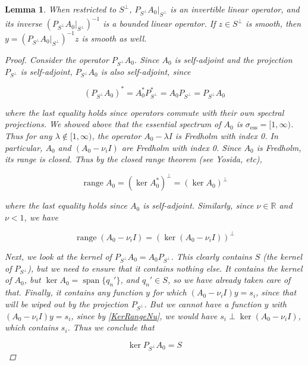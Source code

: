 \documentclass[12pt]{article}
\def\R{{\mathbb R}}
\DeclareMathOperator{\spn}{span}
\DeclareMathOperator{\ran}{range}
\newtheorem{lemma}{Lemma}
\begin{document}

\begin{lemma}\label{PA0inv}
When restricted to $S^\perp$, $P_{S^\perp} A_0 |_{S^\perp}$ is an invertible linear operator, and its inverse $(P_{S^\perp} A_0 |_{S^\perp})^{-1}$ is a bounded linear operator. If $z \in S^\perp$ is smooth, then $y = (P_{S^\perp} A_0 |_{S^\perp})^{-1} z$ is smooth as well.

\begin{proof}
Consider the operator $P_{S^\perp} A_0$. Since $A_0$ is self-adjoint and the projection $P_{S^\perp}$ is self-adjoint, $P_{S^\perp} A_0$ is also self-adjoint, since

\[
(P_{S^\perp} A_0)^* = A_0^* P_{S^\perp}^* = A_0 P_{S^\perp} = P_{S^\perp} A_0
\]

where the last equality holds since operators commute with their own spectral projections. We showed above that the essential spectrum of $A_0$ is $\sigma_{\text{ess}} = [1, \infty)$. Thus for any $\lambda \notin [1, \infty)$, the operator $A_0 - \lambda I$ is Fredholm with index 0. In particular, $A_0$ and $(A_0 - \nu_i I)$ are Fredholm with index 0. Since $A_0$ is Fredholm, its range is closed. Thus by the closed range theorem (see Yosida, etc), 

\begin{equation}
\ran A_0 = (\ker A_0^*)^\perp = (\ker A_0)^\perp
\end{equation}

where the last equality holds since $A_0$ is self-adjoint. Similarly, since $\nu \in \R$ and $\nu < 1$, we have

\begin{equation}\label{KerRangeNu}
\ran (A_0 - \nu_i I) = (\ker (A_0 - \nu_i I))^\perp 
\end{equation}

Next, we look at the kernel of $P_{S^\perp} A_0 = A_0 P_{S^\perp}$. This clearly contains $S$ (the kernel of $P_{S^\perp}$), but we need to ensure that it contains nothing else. It contains the kernel of $A_0$, but $\ker A_0 = \spn\{ q_n' \}$, and $q_n' \in S$, so we have already taken care of that. Finally, it contains any function $y$ for which $(A_0 - \nu_i I) y = s_i$, since that will be wiped out by the projection $P_{S^\perp}$. But we cannot have a function $y$ with $(A_0 - \nu_i I) y = s_i$, since by \eqref{KerRangeNu}, we would have $s_i \perp \ker (A_0 - \nu_i I)$, which contains $s_i$. Thus we conclude that

\[
\ker P_{S^\perp} A_0 = S 
\]


\end{proof}
\end{lemma}
\end{document}
